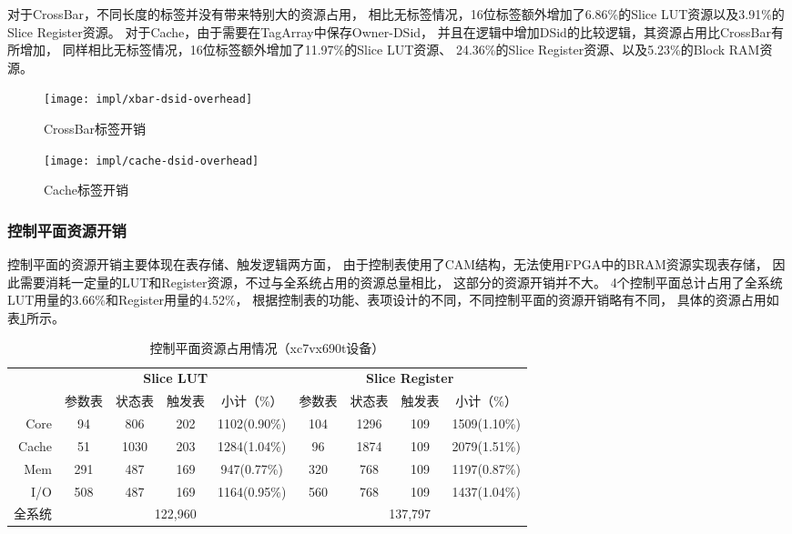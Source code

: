 对于CrossBar，不同长度的标签并没有带来特别大的资源占用，
相比无标签情况，16位标签额外增加了6.86\%的Slice LUT资源以及3.91\%的Slice Register资源。
对于Cache，由于需要在TagArray中保存Owner-DSid，
并且在逻辑中增加DSid的比较逻辑，其资源占用比CrossBar有所增加，
同样相比无标签情况，16位标签额外增加了11.97\%的Slice LUT资源、
24.36\%的Slice Register资源、以及5.23\%的Block RAM资源。

\begin{figure}[tb]
\begin{minipage}{0.48\textwidth}
  \centering
  \texttt{[image: impl/xbar-dsid-overhead]}
  \caption{CrossBar标签开销}
  \label{fig:xbar-dsid-overhead}
\end{minipage}\hfill
\begin{minipage}{0.48\textwidth}
  \centering
  \texttt{[image: impl/cache-dsid-overhead]}
  \caption{Cache标签开销}
  \label{fig:cache-dsid-overhead}
\end{minipage}
\end{figure}


\subsubsection{控制平面资源开销}

控制平面的资源开销主要体现在表存储、触发逻辑两方面，
由于控制表使用了CAM结构，无法使用FPGA中的BRAM资源实现表存储，
因此需要消耗一定量的LUT和Register资源，不过与全系统占用的资源总量相比，
这部分的资源开销并不大。
4个控制平面总计占用了全系统LUT用量的3.66\%和Register用量的4.52\%，
根据控制表的功能、表项设计的不同，不同控制平面的资源开销略有不同，
具体的资源占用如表\ref{tab:pard-cp-resource}所示。

\begin{table}[htb]
  \centering
  \caption{控制平面资源占用情况（xc7vx690t设备）}
  \label{tab:pard-cp-resource}
  \begin{tabular*}{\linewidth}{rcccccccc}
    \toprule[1.5pt]
          & \multicolumn{4}{c}{\textbf{Slice LUT}}  & \multicolumn{4}{c}{\textbf{Slice Register}} \\
          & 参数表 & 状态表 & 触发表 & 小计（\%）   & 参数表 & 状态表 & 触发表 & 小计（\%）       \\
    \midrule[1pt]
     Core &     94 &    806 &    202 & 1102(0.90\%) &    104 &   1296 &    109 & 1509(1.10\%)      \\
    Cache &     51 &   1030 &    203 & 1284(1.04\%) &     96 &   1874 &    109 & 2079(1.51\%)      \\
      Mem &    291 &    487 &    169 &  947(0.77\%) &    320 &    768 &    109 & 1197(0.87\%)      \\
      I/O &    508 &    487 &    169 & 1164(0.95\%) &    560 &    768 &    109 & 1437(1.04\%)      \\
    \hline
   全系统 & \multicolumn{4}{c}{122,960}             & \multicolumn{4}{c}{137,797}                  \\
    \bottomrule[1.5pt]
  \end{tabular*}\\[2pt]
\end{table}

